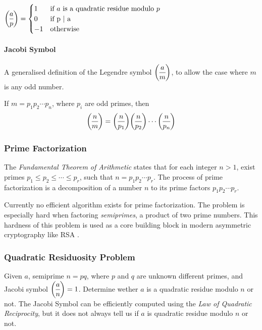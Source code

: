 \begin{center}
	$\dlegendre{a}{p} =
		\begin{cases}
			1 & \text{if $a$ is a quadratic residue modulo $p$}\\
			0 & \text{if p $\arrowvert$ a}\\
			-1 & \text{otherwise}
		\end{cases}$
\end{center}

\paragraph{Jacobi Symbol}
A generalised definition of the Legendre symbol $\dlegendre{a}{m}$, to allow the case where $m$ is any odd number.

If $m = p_1p_2 \cdots p_n$, where $p_i$ are odd primes, then
$$\dlegendre{n}{m} = \dlegendre{n}{p_1}\dlegendre{n}{p_2} \cdots\dlegendre{n}{p_n}$$

\subsubsection{Prime Factorization}
\cite{andrews1994number} The \textit{Fundamental Theorem of Arithmetic} states that for each integer \newline $n > 1$, exist primes $p_1 \le p_2 \le \cdots \le p_r$, such that $n = p_1 p_2 \cdots p_r$.
\bigskip
\newline
The process of prime factorization is a decomposition of a number $n$ to its prime factors $p_1 p_2 \cdots p_r$.

Currently no efficient algorithm exists for prime factorization. The problem is especially hard when factoring \textit{semiprimes}, a product of two prime numbers.
This hardness of this problem is used as a core building block in modern asymmetric cryptography like RSA \cite{rivest1978method}.


\subsubsection{Quadratic Residuosity Problem}
Given $a$, semiprime $n = pq$, where $p$ and $q$ are unknown different primes, and Jacobi symbol $\dlegendre{a}{n} = 1$.
\newline
Determine wether $a$ is a quadratic residue modulo $n$ or not.
\bigskip
\newline
The Jacobi Symbol can be efficiently computed using the \textit{Law of Quadratic Reciprocity}, but it does not always tell us if $a$ is quadratic residue modulo $n$ or not. 

